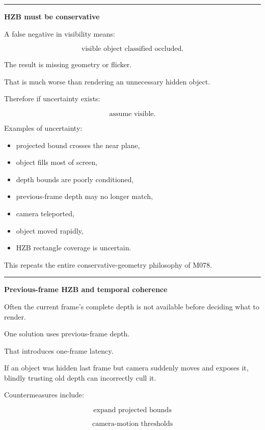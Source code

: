 \begin{center}\rule{0.5\linewidth}{0.5pt}\end{center}

\textbf{HZB must be conservative}

A false negative in visibility means:

\[
\text{visible object classified occluded}.
\]

The result is missing geometry or flicker.

That is much worse than rendering an unnecessary hidden object.

Therefore if uncertainty exists:

\[
\boxed{\text{assume visible}.}
\]

Examples of uncertainty:

\begin{itemize}
\tightlist
\item
  projected bound crosses the near plane,
\item
  object fills most of screen,
\item
  depth bounds are poorly conditioned,
\item
  previous-frame depth may no longer match,
\item
  camera teleported,
\item
  object moved rapidly,
\item
  HZB rectangle coverage is uncertain.
\end{itemize}

This repeats the entire conservative-geometry philosophy of M078.

\begin{center}\rule{0.5\linewidth}{0.5pt}\end{center}

\textbf{Previous-frame HZB and temporal coherence}

Often the current frame's complete depth is not available before deciding what to render.

One solution uses previous-frame depth.

That introduces one-frame latency.

If an object was hidden last frame but camera suddenly moves and exposes it, blindly trusting old depth can incorrectly cull it.

Countermeasures include:

\[
\text{expand projected bounds}
\]

\[
\text{camera-motion thresholds}
\]

